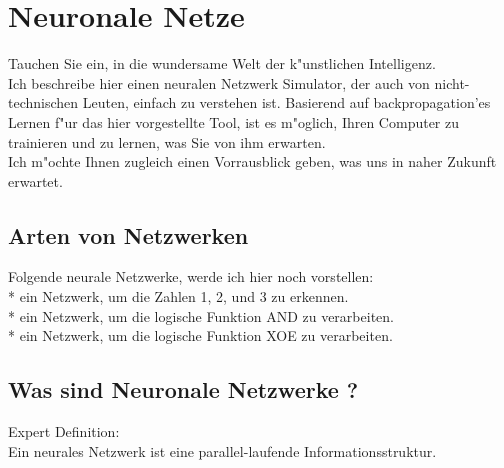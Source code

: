 \newpage
\chapter{Neuronale Netze}
Tauchen Sie ein, in die wundersame Welt der k"unstlichen Intelligenz. \\
Ich beschreibe hier einen neuralen Netzwerk Simulator, der auch von nicht-technischen Leuten,
einfach zu verstehen ist.
Basierend auf backpropagation'es Lernen f"ur das hier vorgestellte Tool, ist es m"oglich,
Ihren Computer zu trainieren und zu lernen, was Sie von ihm erwarten. \\
Ich m"ochte Ihnen zugleich einen Vorrausblick geben, was uns in naher Zukunft erwartet. \\

\section{Arten von Netzwerken}
Folgende neurale Netzwerke, werde ich hier noch vorstellen:\\
* ein Netzwerk, um die Zahlen 1, 2, und 3 zu erkennen. \\
* ein Netzwerk, um die logische Funktion AND zu verarbeiten. \\
* ein Netzwerk, um die logische Funktion XOE zu verarbeiten. \\

\section{Was sind Neuronale Netzwerke ?}
Expert Definition: \\
Ein neurales Netzwerk ist eine parallel-laufende Informationsstruktur.


